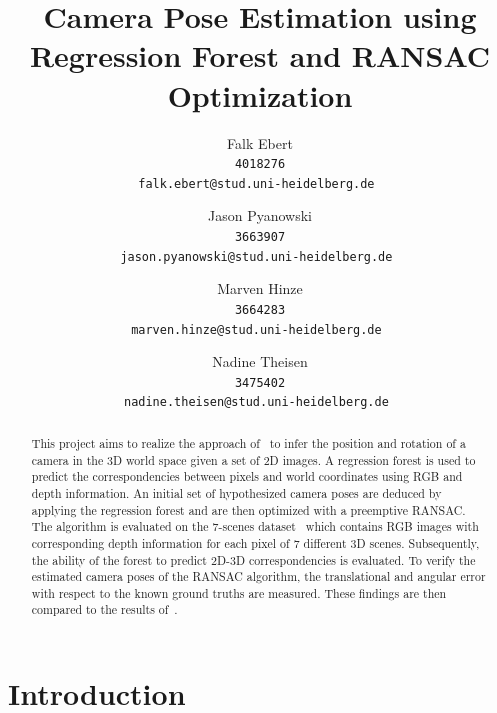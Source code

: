 \documentclass[final]{cvpr}
\begin{document}
\title{Camera Pose Estimation using Regression Forest and RANSAC Optimization}

\author{Falk Ebert\\
\tt 4018276\\
{\tt\small falk.ebert@stud.uni-heidelberg.de}
\and
Jason Pyanowski\\
\tt 3663907\\
{\tt\small jason.pyanowski@stud.uni-heidelberg.de}
\and
Marven Hinze\\
\tt 3664283\\
{\tt\small marven.hinze@stud.uni-heidelberg.de}
\and
Nadine Theisen\\
\tt 3475402\\
{\tt\small nadine.theisen@stud.uni-heidelberg.de}
}

\maketitle


\begin{abstract}
This project aims to realize the approach of~\cite{shotton2013} to infer the position and rotation of a camera
in the 3D world space given a set of 2D images. A regression forest is used to predict the correspondencies between 
pixels and world coordinates using RGB and depth information. An initial set of hypothesized camera
poses are deduced by applying the regression forest and are then optimized with a preemptive RANSAC. The algorithm 
is evaluated on the 7-scenes dataset~\cite{glocker2013} which contains RGB images with corresponding depth
information for each pixel of 7 different 3D scenes. Subsequently, the ability of the forest to predict 2D-3D 
correspondencies is evaluated. To verify the estimated camera poses of the RANSAC algorithm, the translational and 
angular error with respect to the known ground truths are measured. These findings are then compared to the results
of~\cite{shotton2013}. 
\end{abstract}

\section{Introduction}
\end{document}
